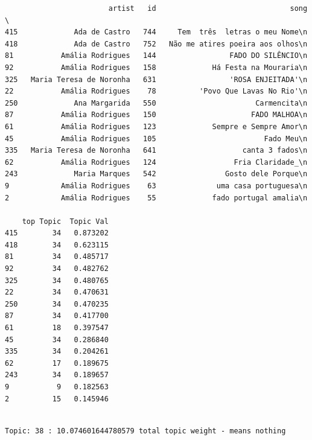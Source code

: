 \documentclass[11pt]{article}
\begin{document}
    
    \begin{verbatim}
                        artist   id                               song  \
415             Ada de Castro   744     Tem  três  letras o meu Nome\n   
418             Ada de Castro   752   Não me atires poeira aos olhos\n   
81           Amália Rodrigues   144                 FADO DO SILÊNCIO\n   
92           Amália Rodrigues   158             Há Festa na Mouraria\n   
325   Maria Teresa de Noronha   631                 'ROSA ENJEITADA'\n   
22           Amália Rodrigues    78          'Povo Que Lavas No Rio'\n   
250             Ana Margarida   550                       Carmencita\n   
87           Amália Rodrigues   150                      FADO MALHOA\n   
61           Amália Rodrigues   123             Sempre e Sempre Amor\n   
45           Amália Rodrigues   105                         Fado Meu\n   
335   Maria Teresa de Noronha   641                    canta 3 fados\n   
62           Amália Rodrigues   124                  Fria Claridade_\n   
243             Maria Marques   542                Gosto dele Porque\n   
9            Amália Rodrigues    63              uma casa portuguesa\n   
2            Amália Rodrigues    55             fado portugal amalia\n   

    top Topic  Topic Val  
415        34   0.873202  
418        34   0.623115  
81         34   0.485717  
92         34   0.482762  
325        34   0.480765  
22         34   0.470631  
250        34   0.470235  
87         34   0.417700  
61         18   0.397547  
45         34   0.286840  
335        34   0.204261  
62         17   0.189675  
243        34   0.189657  
9           9   0.182563  
2          15   0.145946  
    \end{verbatim}

    
    \begin{Verbatim}[commandchars=\\\{\}]

Topic: 38 : 10.074601644780579 total topic weight - means nothing

    \end{Verbatim}
\end{document}
